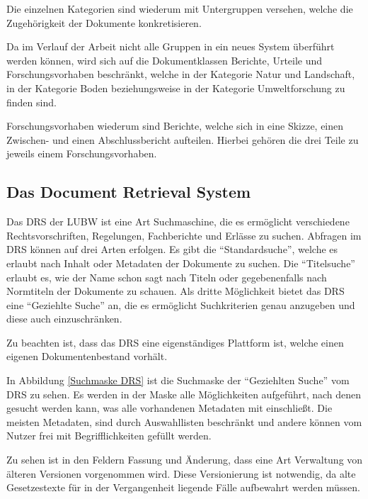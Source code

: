 Die einzelnen Kategorien sind wiederum mit Untergruppen versehen, welche die Zugeh\"origkeit der Dokumente konkretisieren.

Da im Verlauf der Arbeit nicht alle Gruppen in ein neues System \"uberf\"uhrt werden k\"onnen, wird sich auf die Dokumentklassen Berichte, Urteile und Forschungsvorhaben beschr\"ankt, welche in der Kategorie Natur und Landschaft, in der Kategorie Boden beziehungsweise in der Kategorie Umweltforschung zu finden sind.

Forschungsvorhaben wiederum sind Berichte, welche sich in eine Skizze, einen Zwischen- und einen Abschlussbericht aufteilen. Hierbei geh\"oren die drei Teile zu jeweils einem Forschungsvorhaben. \cite{LUBW_FADO}

\subsection{Das Document Retrieval System} \label{DRS}
Das \ac{DRS} der \ac{LUBW} ist eine Art Suchmaschine, die es erm\"oglicht verschiedene Rechtsvorschriften, Regelungen, Fachberichte und Erl\"asse zu suchen. Abfragen im \ac{DRS} k\"onnen auf drei Arten erfolgen. Es gibt die "`Standardsuche"', welche es erlaubt nach Inhalt oder Metadaten der Dokumente zu suchen. Die "`Titelsuche"' erlaubt es, wie der Name schon sagt nach Titeln oder gegebenenfalls nach Normtiteln der Dokumente zu schauen. Als dritte M\"oglichkeit bietet das \ac{DRS} eine "`Geziehlte Suche"' an, die es erm\"oglicht Suchkriterien genau anzugeben und diese auch einzuschr\"anken.
\cite{DRS}

Zu beachten ist, dass das \ac{DRS} eine eigenst\"andiges Plattform ist, welche einen eigenen Dokumentenbestand vorh\"alt.

In Abbildung \ref{Suchmaske DRS} ist die Suchmaske der "`Geziehlten Suche"' vom \ac{DRS} zu sehen. Es werden in der Maske alle M\"oglichkeiten aufgef\"uhrt, nach denen gesucht werden kann, was alle vorhandenen Metadaten mit einschlie\ss{}t. Die meisten Metadaten, sind durch Auswahllisten beschr\"ankt und andere k\"onnen vom Nutzer frei mit Begrifflichkeiten gef\"ullt werden.

Zu sehen ist in den Feldern Fassung und \"Anderung, dass eine Art Verwaltung von \"alteren Versionen vorgenommen wird. Diese Versionierung ist notwendig, da alte Gesetzestexte f\"ur in der Vergangenheit liegende F\"alle aufbewahrt werden m\"ussen.

